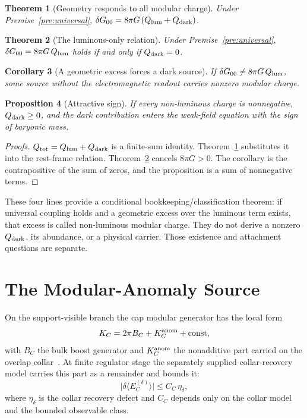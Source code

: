 \documentclass[11pt]{article}
\newtheorem{theorem}{Theorem}[section]
\newtheorem{proposition}[theorem]{Proposition}
\newtheorem{corollary}[theorem]{Corollary}
\begin{document}
\begin{theorem}[Geometry responds to all modular charge]
\label{thm:all-charge}
Under Premise~\ref{pre:universal},
\(\delta G_{00}=8\pi G\,(Q_{\rm lum}+Q_{\rm dark})\).
\end{theorem}

\begin{theorem}[The luminous-only relation]
\label{thm:iff}
Under Premise~\ref{pre:universal}, \(\delta G_{00}=8\pi G\,Q_{\rm lum}\)
holds if and only if \(Q_{\rm dark}=0\).
\end{theorem}

\begin{corollary}[A geometric excess forces a dark source]
\label{cor:excess}
If \(\delta G_{00}\neq8\pi G\,Q_{\rm lum}\), some source without the
electromagnetic readout carries nonzero modular charge.
\end{corollary}

\begin{proposition}[Attractive sign]
\label{prop:sign}
If every non-luminous charge is nonnegative, \(Q_{\rm dark}\ge0\), and the
dark contribution enters the weak-field equation with the sign of baryonic
mass.
\end{proposition}

\begin{proof}[Proofs]
\(Q_{\rm tot}=Q_{\rm lum}+Q_{\rm dark}\) is a finite-sum identity.
Theorem~\ref{thm:all-charge} substitutes it into the rest-frame relation.
Theorem~\ref{thm:iff} cancels \(8\pi G>0\). The corollary is the
contrapositive of the sum of zeros, and the proposition is a sum of
nonnegative terms.
\end{proof}

These four lines provide a conditional bookkeeping/classification theorem: if
universal coupling holds and a geometric excess over the luminous term exists,
that excess is called non-luminous modular charge. They do not derive a
nonzero \(Q_{\rm dark}\), its abundance, or a physical carrier. Those existence
and attachment questions are separate.

\section{The Modular-Anomaly Source}
\label{sec:source}

On the support-visible branch the cap modular generator has the local form
\begin{equation}
K_C=2\pi B_C+K_C^{\rm anom}+\mathrm{const},
\label{eq:split}
\end{equation}
with \(B_C\) the bulk boost generator and \(K_C^{\rm anom}\) the nonadditive
part carried on the overlap collar~\cite{ophEinstein}. At finite regulator
stage the separately supplied collar-recovery model carries this part as a
remainder and bounds it:
\begin{equation}
\bigl|\delta\langle E_C^{(\delta)}\rangle\bigr|\le C_C\,\eta_\delta,
\label{eq:bound}
\end{equation}
where \(\eta_\delta\) is the collar recovery defect and \(C_C\) depends only
on the collar model and the bounded observable class.
\end{document}
